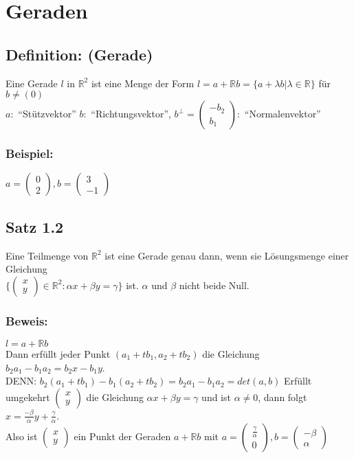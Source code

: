 \section{Geraden}
%
%
%
\subsection{Definition: (Gerade)}
%
%
%
Eine Gerade $l$ in $\mathbb{R}^{2}$ ist eine Menge der Form $l=a+\mathbb{R}b=\{a+\lambda b|\lambda \in \mathbb{R}\}$ für $b \neq (0)$\\
$a:$ "`Stützvektor"' \quad $b:$ "`Richtungsvektor"', \quad $b^{\perp}=\begin{pmatrix}-b_{2} \\ b_{1} \end{pmatrix}:$ "`Normalenvektor"'
%
\subsubsection{Beispiel: }
$a=\begin{pmatrix} 0 \\ 2 \end{pmatrix}, b=\begin{pmatrix} 3 \\ -1 \end{pmatrix}$
%
%
%
%
\subsection{Satz 1.2}
Eine Teilmenge von $\mathbb{R}^{2}$ ist eine Gerade genau dann, wenn sie Lösungsmenge einer Gleichung \\
$\{\begin{pmatrix}x \\ y \end{pmatrix} \in \mathbb{R}^{2} : \alpha x + \beta y = \gamma\}$ ist. $\alpha$ und $\beta$ nicht beide Null.
%
%
%
\subsubsection{Beweis:}
$l=a + \mathbb{R}b$\\
Dann erfüllt jeder Punkt $(a_{1}+tb_{1},a_{2}+tb_{2})$ die Gleichung $b_{2}a_{1}-b_{1}a_{2} = b_{2}x-b_{1}y$.\\
DENN:  $b_{2}(a_{1}+tb_{1})-b_{1}(a_{2}+tb_{2})=b_{2}a_{1}-b_{1}a_{2}=det(a,b)$ Erfüllt umgekehrt $\begin{pmatrix}x \\ y \end{pmatrix}$ die Gleichung $\alpha x + \beta y = \gamma$ und ist $\alpha \neq 0$, dann folgt $x=\frac{-\beta}{\alpha}y+\frac{\gamma}{\alpha}$. \\ 
Also ist $\begin{pmatrix}x \\ y \end{pmatrix}$ ein Punkt der Geraden $a + \mathbb{R}b$ mit $a=\begin{pmatrix} \frac{\gamma}{\alpha} \\ 0 \end{pmatrix}, b=\begin{pmatrix} -\beta \\ \alpha \end{pmatrix}$\\
%
%
%
